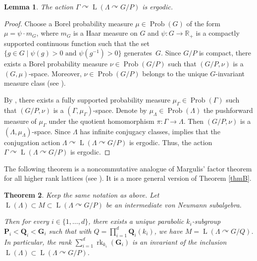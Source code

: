 \documentclass[JEP,XML,SOM,Unicode,published]{cedram}
\newcommand{\bG}{\boldsymbol{G}}
\newcommand{\bP}{\boldsymbol{P}}
\newcommand{\bQ}{\boldsymbol{Q}}
\newtheorem{thm}{Theorem}[section]
\newtheorem{lem}[thm]{Lemma}
\theoremstyle{definition}
\newcommand{\R}{\mathbb{R}}
\DeclareMathOperator{\Prob}{Prob}
\DeclareMathOperator{\rk}{rk}
\DeclareMathOperator{\rL}{L}
\begin{document}
\begin{lem}\label{lem-conjugation}
The action $\Gamma \curvearrowright \rL(\Lambda \curvearrowright G/P)$ is ergodic.
\end{lem}

\begin{proof}
Choose a Borel probability measure $\mu \in \Prob(G)$ of the form $\mu = \psi \cdot m_G$, where $m_G$ is a Haar measure on $G$ and $\psi : G \to \R_+$ is a compactly supported continuous function such that the set $\{g \in G \mid \psi(g) > 0 \text{ and } \psi(g^{-1}) > 0\}$ generates~$G$. Since $G/P$ is compact, there exists a Borel probability measure $\nu \in \Prob(G/P)$ such that $(G/P, \nu)$ is a $(G, \mu)$-space. Moreover, $\nu\in \Prob(G/P)$ belongs to the unique $G$-invariant measure class (see \eg \cite[Lem.\,1.1]{NZ97}).

By \cite[Prop.\,VI.4.1]{Ma91}, there exists a fully supported probability measure $\mu_\Gamma \in \Prob(\Gamma)$ such that $(G/P, \nu)$ is a $(\Gamma, \mu_\Gamma)$-space. Denote by $\mu_\Lambda \in \Prob(\Lambda)$ the pushforward measure of $\mu_\Gamma$ under the quotient homomorphism $\pi : \Gamma \to \Lambda$. Then $(G/P, \nu)$ is a $(\Lambda, \mu_\Lambda)$-space. Since $\Lambda$ has infinite conjugacy classes, \cite[Lem.\,2.6]{KP21} implies that the conjugation action $\Lambda \curvearrowright \rL(\Lambda \curvearrowright G/P)$ is ergodic. Thus, the action $\Gamma \curvearrowright \rL(\Lambda \curvearrowright G/P)$ is ergodic.
\end{proof}

The following theorem is a noncommutative analogue of Margulis'\! factor theorem for all higher rank lattices (see \cite[Th.\,IV.2.11]{Ma91}). It is a more general version of Theorem \ref{thmB}.

\begin{thm}\label{thm-higher-rank}
Keep the same notation as above. Let $\rL(\Lambda) \subset M \subset \rL(\Lambda \curvearrowright G/P)$ be an intermediate von Neumann subalgebra.

Then for every $i \in \{1, \dots, d\}$, there exists a unique parabolic $k_i$-subgroup $\bP_i < \bQ_i < \bG_i$ such that with $Q = \prod_{i = 1}^d \bQ_i(k_i)$, we have $M = \rL(\Lambda \curvearrowright G/Q)$. In particular, the rank $\sum_{i = 1}^d \rk_{k_i}(\bG_i)$ is an invariant of the inclusion $\rL(\Lambda) \subset \rL(\Lambda \curvearrowright G/P)$.
\end{thm}
\end{document}
